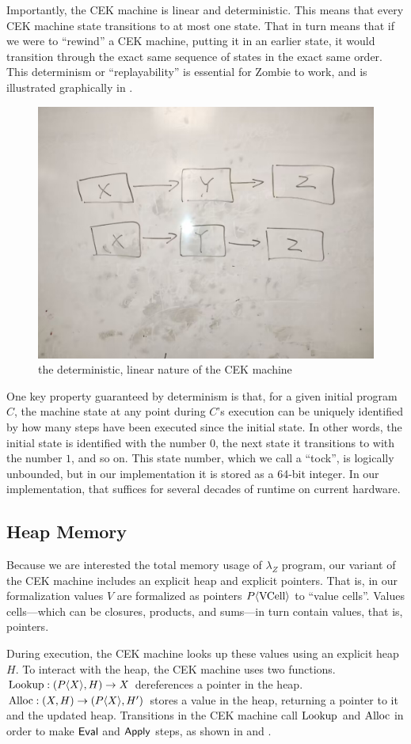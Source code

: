 Importantly, the CEK machine is linear and deterministic. This means
that every CEK machine state transitions to at most one state. That in
turn means that if we were to ``rewind'' a CEK machine, putting it in
an earlier state, it would transition through the exact same sequence
of states in the exact same order. This determinism or
``replayability'' is essential for Zombie to work, and is illustrated
graphically in .

\begin{figure}
\includegraphics[width=0.5\columnwidth]{img0}
\caption{the deterministic, linear nature of the CEK machine}
\label{fig:replayability}
\end{figure}

One key property guaranteed by determinism is that, for a given
initial program $C$, the machine state at any point during $C$'s
execution can be uniquely identified by how many steps have been
executed since the initial state. In other words, the initial state is
identified with the number $0$, the next state it transitions to with
the number $1$, and so on. This state number, which we call a
``tock'', is logically unbounded, but in our implementation it is
stored as a 64-bit integer. In our implementation, that suffices for
several decades of runtime on current hardware. 

\subsection{Heap Memory}

Because we are interested the total memory usage of $\lambda_Z$
program, our variant of the CEK machine includes an explicit heap and
explicit pointers. That is, in our formalization values $V$ are
formalized as pointers $P\langle \text{\textnormal{VCell}} \rangle$ to ``value cells''.
Values cells---which can be closures, products, and sums---in turn
contain values, that is, pointers.

During execution, the CEK machine looks up these values using an
explicit heap $H$. To interact with the heap, the CEK machine uses two
functions. $\textrm{Lookup} : (P \langle X \rangle, H) \to X$ dereferences a
pointer in the heap. $\textrm{Alloc} : (X, H) \to (P \langle X \rangle, H')$
stores a value in the heap, returning a pointer to it and the updated
heap. Transitions in the CEK machine call $\textrm{Lookup}$ and $\textrm{Alloc}$ in
order to make $\text{\textsf{Eval}}$ and $\text{\textsf{Apply}}$ steps, as shown in 
and .

